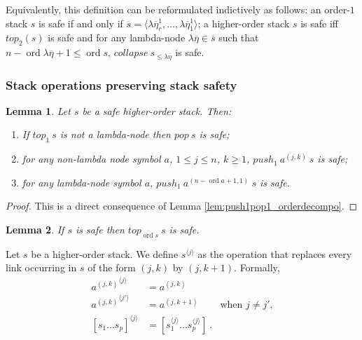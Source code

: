 \documentclass{article}
\newcommand{\ord}{\mathop{\mathrm{ord}}}
\newcommand{\prefixof}{\leqslant}
\newtheorem{lemma}{Lemma}[section]
\theoremstyle{remark}
\theoremstyle{definition}
\newcommand\orddec\overline
\begin{document}
Equivalently, this definition can be reformulated indictively as follows:
an order-$1$ stack $s$ is safe if and only if $\orddec{s} = \langle \lambda \overline{\eta}_r^1, \ldots , \lambda \overline{\eta}_1^1 \rangle$;
a higher-order stack $s$ is safe iff $top_2(s)$ is safe and
for any lambda-node $\lambda \overline{\eta} \in \orddec{s}$ such that $n-\ord{\lambda \overline{\eta}}+1 \leq \ord{s}$,
    $collapse~s_{\prefixof \lambda \overline{\eta}}$ is safe.


\subsubsection{Stack operations preserving stack safety}
\begin{lemma}
\label{lem:push1pop1_preserves_safety} Let $s$ be a safe higher-order
stack. Then:
\begin{enumerate}
  \item If $top_1\ s$ is not a lambda-node then $pop\ s$ is safe;
  \item for any non-lambda node symbol $a$, $1 \leq j \leq n$, $k \geq 1$, $push_1\ a^{(j,k)}\ s$ is safe;
  \item for any lambda-node symbol $a$, $push_1\ a^{(n-\ord{a}+1,1)}\ s$ is safe.
\end{enumerate}
\end{lemma}
\begin{proof}
This is a direct consequence of Lemma
\ref{lem:push1pop1_orderdecompo}.
\end{proof}


\begin{lemma}
\label{lem:top_qsafe} If $s$ is safe then $top_{\ord{s}}~s$ is safe.
\end{lemma}


Let $s$ be a higher-order stack. We define $s^{\langle j \rangle}$ as the operation that replaces
every link occurring in $s$ of the form $(j,k)$ by $(j,k+1)$. Formally,
\begin{align*}
{a^{(j,k)}}^{\langle j \rangle} &= a^{(j,k)}   \\
{a^{(j,k)}}^{\langle j' \rangle} &= a^{(j,k+1)} &   \mbox{when $j\neq j'$,}\\
[s_1 \ldots s_p]^{\langle j \rangle} &= [s_1^{\langle j \rangle} \ldots s_p^{\langle j \rangle}] \ .
\end{align*}
\end{document}
